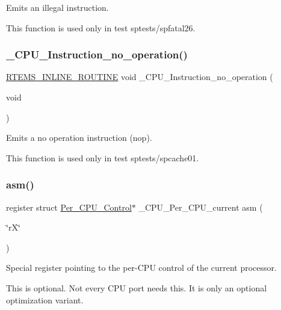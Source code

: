 Emits an illegal instruction. 

This function is used only in test sptests/spfatal26. \mbox{\label{group__RTEMSScoreCPUExample_gab683a0a37a089e2a0fd3c356836d5499}} 
\subsubsection{\texorpdfstring{\_CPU\_Instruction\_no\_operation()}{\_CPU\_Instruction\_no\_operation()}}
{\footnotesize\ttfamily \mbox{\hyperlink{group__RTEMSScoreBaseDefs_gac216239df231d5dbd15e3520b0b9313f}{R\+T\+E\+M\+S\+\_\+\+I\+N\+L\+I\+N\+E\+\_\+\+R\+O\+U\+T\+I\+NE}} void \+\_\+\+C\+P\+U\+\_\+\+Instruction\+\_\+no\+\_\+operation (\begin{DoxyParamCaption}\item[{void}]{ }\end{DoxyParamCaption})}



Emits a no operation instruction (nop). 

This function is used only in test sptests/spcache01. \mbox{\label{group__RTEMSScoreCPUExample_ga04cbac6d343a5c80b8e4547131c6bfcd}} 
\subsubsection{\texorpdfstring{asm()}{asm()}}
{\footnotesize\ttfamily register struct \mbox{\hyperlink{structPer__CPU__Control}{Per\+\_\+\+C\+P\+U\+\_\+\+Control}}$\ast$ \+\_\+\+C\+P\+U\+\_\+\+Per\+\_\+\+C\+P\+U\+\_\+current asm (\begin{DoxyParamCaption}\item[{\char`\"{}rX\char`\"{}}]{ }\end{DoxyParamCaption})}



Special register pointing to the per-\/\+C\+PU control of the current processor. 

This is optional. Not every C\+PU port needs this. It is only an optional optimization variant. 